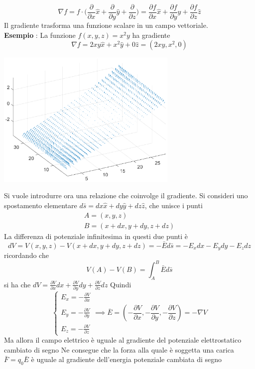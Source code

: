 \documentclass[10pt, letterpaper]{report}
\begin{document}
$$ \nabla f = f\cdot\Big( 
    \dfrac{\partial}{\partial x}\hat x+\dfrac{\partial}{\partial y}\hat y+\dfrac{\partial}{\partial z}    
\Big)= \dfrac{\partial f}{\partial x}\hat x+\dfrac{\partial f}{\partial y}\hat y+\dfrac{\partial f}{\partial z}\hat z$$
Il gradiente trasforma una funzione scalare in un campo vettoriale.\\
\textbf{Esempio} : La funzione $f(x,y,z)=x^2y$ ha gradiente 
$$ \nabla f = 2xy\hat x + x^2\hat y + 0\hat z = (2xy,x^2,0) $$
\begin{center}
    \includegraphics[width=0.65\textwidth]{images/grad.eps}
\end{center}
Si vuole introdurre ora una relazione che coinvolge il gradiente. Si consideri uno spostamento elementare $d\bar s = dx \hat x + dy\hat y +dz\hat z$, che unisce i punti 
$$\begin{matrix}
    A = (x,y,z)\\ 
    B= (x+dx,y+dy,z+dz)
\end{matrix}$$ 
La differenza di potenziale infinitesima in questi due punti è 
$$ dV=V(x,y,z)-V(x+dx,y+dy,z+dz)=-\bar E d\bar s = -E_x dx - E_y dy - E_z dz$$
ricordando che 
$$ V(A)-V(B)=\int_A^B \bar E d\bar s$$ 
si ha che 
$dV=\frac{\partial V}{\partial x}dx+\frac{\partial V}{\partial y}dy+\frac{\partial V}{\partial z}dz$
Quindi 
$$ \begin{cases}
    E_x=-\displaystyle\frac{\partial V}{\partial x}\\  \\
    E_y=-\displaystyle\frac{\partial V}{\partial y}\\  \\
    E_z=-\displaystyle\frac{\partial V}{\partial z}
\end{cases}\implies \bar E = (-\frac{\partial V}{\partial x},-\frac{\partial V}{\partial y},-\frac{\partial V}{\partial z})=-\nabla V$$
Ma allora il campo elettrico è uguale al gradiente del potenziale elettrostatico cambiato di segno
Ne consegue che la forza alla quale è soggetta una carica $\bar F = q_0\bar E$ è uguale al gradiente dell'energia potenziale cambiata di segno 
\end{document}
